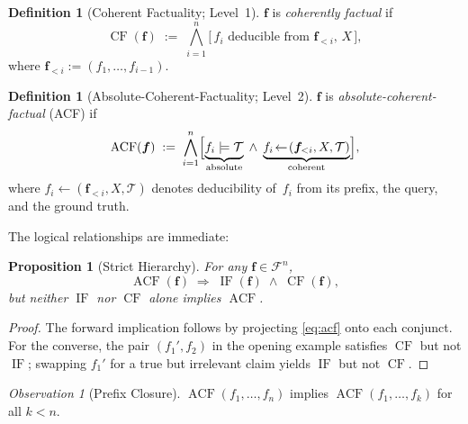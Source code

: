 \documentclass{uai2026} %
\theoremstyle{remark}
\newtheorem{observation}{Observation}
\theoremstyle{plain}
\newtheorem{proposition}[theorem]{Proposition}
\theoremstyle{definition}
\newtheorem{definition}[theorem]{Definition}
\begin{document}
\begin{definition}[Coherent Factuality; Level~1]
\label{def:coh-fact}
$\bm{f}$ is \emph{coherently factual} if
\begin{equation}\label{eq:level1}
  \operatorname{CF}(\bm{f})
  \;:=\;
  \bigwedge_{i=1}^{n}
  \bigl[\,f_{i}\text{ deducible from }
  \bm{f}_{<i},\,X\,\bigr],
\end{equation}
where $\bm{f}_{<i}:=(f_{1},\dots,f_{i-1})$.
\end{definition}

\begin{definition}[Absolute-Coherent-Factuality; Level~2]
\label{def:absolute-coherent-factuality}
$\bm{f}$ is \emph{absolute-coherent-factual} (ACF) if
\begin{equation}\label{eq:acf}
  \operatorname{ACF}(\bm{f})
  \;:=\;
  \bigwedge_{i=1}^{n}
  \Bigl[
    \underbrace{f_{i}\models\mathcal{T}}_{\text{absolute}}
    \;\wedge\;
    \underbrace{
      f_{i}\!\leftarrow\!
      (\bm{f}_{<i},X,\mathcal{T})
    }_{\text{coherent}}
  \Bigr],
\end{equation}
where $f_{i}\!\leftarrow\!(\bm{f}_{<i},X,\mathcal{T})$
denotes deducibility of~$f_{i}$ from its prefix, the
query, and the ground truth.
\end{definition}

The logical relationships are immediate:

\begin{proposition}[Strict Hierarchy]
\label{prop:hierarchy}
For any $\bm{f}\in\mathcal{F}^{n}$,
\begin{equation}\label{eq:hierarchy}
  \operatorname{ACF}(\bm{f})
  \;\Longrightarrow\;
  \operatorname{IF}(\bm{f})
  \;\wedge\;
  \operatorname{CF}(\bm{f}),
\end{equation}
but neither $\operatorname{IF}$ nor $\operatorname{CF}$
alone implies $\operatorname{ACF}$.
\end{proposition}

\begin{proof}
The forward implication follows by projecting
\eqref{eq:acf} onto each conjunct.  For the converse,
the pair $(f_{1}',f_{2})$ in the opening example
satisfies $\operatorname{CF}$ but not
$\operatorname{IF}$; swapping $f_{1}'$ for a true but
irrelevant claim yields $\operatorname{IF}$ but not
$\operatorname{CF}$.
\end{proof}

\begin{observation}[Prefix Closure]
\label{obs:prefix}
$\operatorname{ACF}(f_{1},\dots,f_{n})$ implies
$\operatorname{ACF}(f_{1},\dots,f_{k})$ for all $k<n$.
\end{observation}
\end{document}
